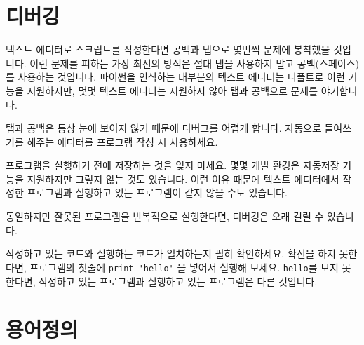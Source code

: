 \section{디버깅}
\label{editor}

텍스트 에디터로 스크립트를 작성한다면 공백과 탭으로 몇번씩 문제에 봉착했을 것입니다. 이런 문제를 피하는 가장 최선의 방식은 절대 탭을 사용하지 말고
공백(스페이스)를 사용하는 것입니다. 파이썬을 인식하는 대부분의 텍스트 에디터는 디폴트로 이런 기능을 지원하지만, 몇몇 텍스트 에디터는 지원하지 않아 탭과 공백으로 문제를 야기합니다.


탭과 공백은 통상 눈에 보이지 않기 때문에 디버그를 어렵게 합니다. 자동으로 들여쓰기를 해주는 에디터를 프로그램 작성 시 사용하세요.

프로그램을 실행하기 전에 저장하는 것을 잊지 마세요. 몇몇 개발 환경은 자동저장 기능을 지원하지만 그렇지 않는 것도 있습니다.
이런 이유 때문에 텍스트 에디터에서 작성한 프로그램과 실행하고 있는 프로그램이 같지 않을 수도 있습니다.

동일하지만 잘못된 프로그램을 반복적으로 실행한다면, 디버깅은 오래 걸릴 수 있습니다.

작성하고 있는 코드와 실행하는 코드가 일치하는지 필히 확인하세요. 확신을 하지 못한다면, 프로그램의 첫줄에 \verb"print 'hello'" 을 넣어서 실행해 보세요.
\verb"hello"를 보지 못한다면, 작성하고 있는 프로그램과 실행하고 있는 프로그램은 다른 것입니다.


\section{용어정의}

